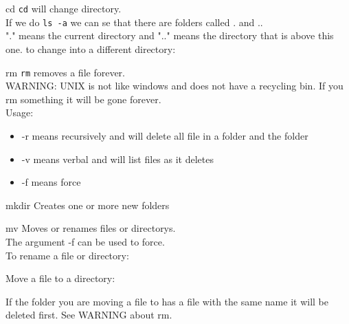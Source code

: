 \documentclass{beamer}
\begin{document}
\begin{frame}{cd}
\texttt{cd} will change directory.\\If we do \texttt{ls -a} we can se that there are folders called . and ..\\"." means the current directory and ".." means the directory that is above this one.
to change into a different directory:
\begin{center}
\end{center}
\end{frame}

\begin{frame}{rm}
\texttt{rm} removes a file forever.\\
WARNING: UNIX is not like windows and does not have a recycling bin. If you rm something it will be gone forever.\\
Usage:
\begin{center}
\end{center}
\begin{itemize}
    \item -r means recursively and will delete all file in a folder and the folder
    \item -v means verbal and will list files as it deletes
    \item -f means force
\end{itemize}
\end{frame}

\begin{frame}{mkdir}
Creates one or more new folders
\begin{center}
\end{center}
\end{frame}

\begin{frame}{mv}
Moves or renames files or directorys.\\The argument -f can be used to force.\\
To rename a file or directory:
\begin{center}
\end{center}
\begin{center}
\end{center}
Move a file to a directory:
\begin{center}
\end{center}
If the folder you are moving a file to has a file with the same name it will be deleted first. See WARNING about rm.
\end{frame}
\end{document}
